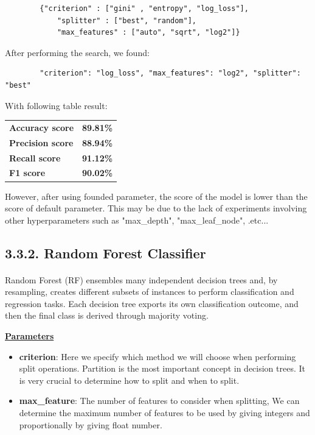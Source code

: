 \documentclass[a4paper]{report}
\begin{document}
	\begin{verbatim}
		{"criterion" : ["gini" , "entropy", "log_loss"], 
			"splitter" : ["best", "random"], 
			"max_features" : ["auto", "sqrt", "log2"]}
	\end{verbatim}
	
	
	After performing the search, we found:
	\begin{verbatim}
		"criterion": "log_loss", "max_features": "log2", "splitter": "best"
	\end{verbatim}
	With following table result:
	
	\begin{center}
		\begin{tabular}{ll}
			\toprule
			\textbf{Accuracy score} & \textbf{89.81\%} \\
			\textbf{Precision score}  & \textbf{88.94\%} \\
			\textbf{Recall score}     & \textbf{91.12\%} \\
			\textbf{F1 score}   & \textbf{90.02\%} \\
			\bottomrule
		\end{tabular}
	\end{center}
	
	However, after using founded parameter, the score of the model is lower than the score of default parameter. This may be due to the lack of experiments involving other hyperparameters such as "max\_depth", "max\_leaf\_node", .etc...
	
	
	
	
	\subsection*{3.3.2. Random Forest Classifier} \Large
	\paragraph{}
	Random Forest (RF) \cite{RF} ensembles many independent decision trees and, by resampling, creates different subsets of instances to perform classification and regression tasks. Each decision tree exports its own classification outcome, and then the final class is derived through majority voting. 
	
	\underline{\textbf{\Large Parameters}}
	\begin{itemize} 
		\item \textbf{criterion}: Here we specify which method we will choose when performing split operations. Partition is the most important concept in decision trees. It is very crucial to determine how to split and when to split.
		\item \textbf{max\_feature}: The number of features to consider when splitting, We can determine the maximum number of features to be used by giving integers and proportionally by giving float number.
	\end{itemize}
	
\end{document}
